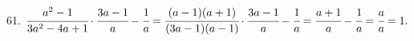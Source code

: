 61. $\cfrac{a^2-1}{3a^2-4a+1}\cdot\cfrac{3a-1}{a}-\cfrac{1}{a}=
\cfrac{(a-1)(a+1)}{(3a-1)(a-1)}\cdot\cfrac{3a-1}{a}-\cfrac{1}{a}=\cfrac{a+1}{a}-\cfrac{1}{a}=\cfrac{a}{a}=1.$\\

